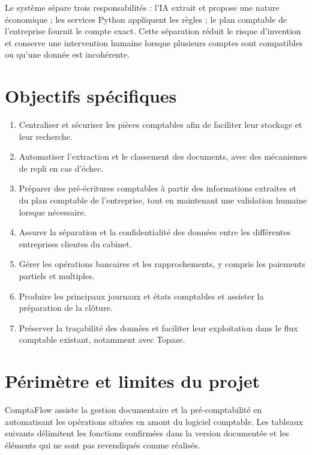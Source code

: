 \documentclass[12pt,a4paper,oneside]{report}
\begin{document}
Le système sépare trois responsabilités : l'IA extrait et propose une nature économique ; les services Python appliquent les règles ; le plan comptable de l'entreprise fournit le compte exact. Cette séparation réduit le risque d'invention et conserve une intervention humaine lorsque plusieurs comptes sont compatibles ou qu'une donnée est incohérente.

\section{Objectifs spécifiques}

\begin{enumerate}[leftmargin=*]
  \item Centraliser et sécuriser les pièces comptables afin de faciliter leur stockage et leur recherche.
  \item Automatiser l'extraction et le classement des documents, avec des mécanismes de repli en cas d'échec.
  \item Préparer des pré-écritures comptables à partir des informations extraites et du plan comptable de l'entreprise, tout en maintenant une validation humaine lorsque nécessaire.
  \item Assurer la séparation et la confidentialité des données entre les différentes entreprises clientes du cabinet.
  \item Gérer les opérations bancaires et les rapprochements, y compris les paiements partiels et multiples.
  \item Produire les principaux journaux et états comptables et assister la préparation de la clôture.
  \item Préserver la traçabilité des données et faciliter leur exploitation dans le flux comptable existant, notamment avec Topaze.
\end{enumerate}

\section{Périmètre et limites du projet}

ComptaFlow assiste la gestion documentaire et la pré-comptabilité en automatisant
les opérations situées en amont du logiciel comptable. Les tableaux suivants
délimitent les fonctions confirmées dans la version documentée et les éléments
qui ne sont pas revendiqués comme réalisés.
\end{document}
